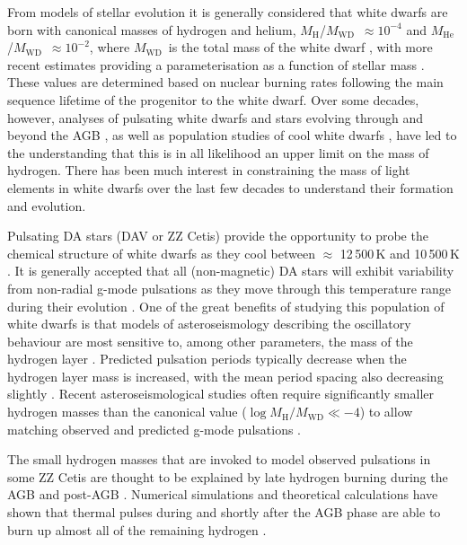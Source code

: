 \documentclass[a4paper,fleqn,usenatbib]{mnras}
\newcommand{\Mwd}{$M_{\mathrm{WD}}$}
\newcommand{\MH}{$M_{\mathrm{H}}$}
\newcommand{\MHe}{$M_{\mathrm{He}}$}
\begin{document}
From models of stellar evolution it is generally considered that white dwarfs are born with canonical masses of hydrogen and helium, \MH/\Mwd\ $\approx 10^{-4}$ and \MHe/\Mwd\ $\approx 10^{-2}$, where \Mwd\ is the total mass of the white dwarf \citep{schoenberner83,iben1983,dantona90},  with more recent estimates providing a parameterisation as a function of stellar mass \citep{althaus15,romero17}. These values are determined based on nuclear burning rates following the main sequence lifetime of the progenitor to the white dwarf. Over some decades, however, analyses of pulsating white dwarfs and stars evolving through and beyond the AGB \citep{werner06,deGeronimo18}, as well as population studies of cool white dwarfs \citep{tremblay08,rolland18,blouin19}, have led to the understanding that this is in all likelihood an upper limit on the mass of hydrogen. There has been much interest in constraining the mass of light elements in white dwarfs over the last few decades to understand their formation and evolution. 

Pulsating DA stars (DAV or ZZ Cetis) provide the opportunity to probe the chemical structure of white dwarfs as they cool between $\approx$ 12\,500\,K and 10\,500\,K \citep{tremblay15b}. It is generally accepted that all (non-magnetic) DA stars will exhibit variability from non-radial g-mode pulsations as they move through this temperature range during their evolution \citep{brickhill83,brickhill91,bradley96,fontaine08}. One of the great benefits of studying this population of white dwarfs is that models of asteroseismology describing the oscillatory behaviour are most sensitive to, among other parameters, the mass of the hydrogen layer \citep{fontaine08}. Predicted pulsation periods typically decrease when the hydrogen layer mass is increased, with the mean period spacing also decreasing slightly \citep{bradley96}. Recent asteroseismological studies often require significantly smaller hydrogen masses than the canonical value ($\log M_{\mathrm{H}}/M_{\mathrm{WD}} \ll -4$) to allow matching observed and predicted g-mode pulsations \citep{giammichele16,romero17}.

The small hydrogen masses that are invoked to model observed pulsations in some ZZ Cetis are thought to be explained by late hydrogen burning during the AGB and post-AGB \citep{dantona90,herwig99,werner06,althaus10}. Numerical simulations and theoretical calculations have shown that thermal pulses during and shortly after the AGB phase are able to burn up almost all of the remaining hydrogen \citep{straniero02}.
\end{document}
